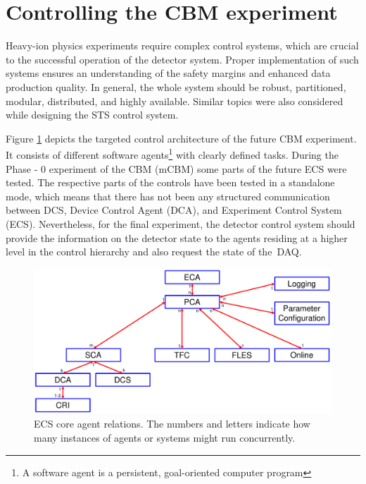 \section{Controlling the CBM experiment}

Heavy-ion physics experiments require complex control systems, which are crucial to the successful operation of the detector system. Proper implementation of such systems ensures an understanding of the safety margins and enhanced data production quality. In general, the whole system should be robust, partitioned, modular, distributed, and highly available. Similar topics were also considered while designing the \gls{STS} control system.

Figure \ref{fig_sim} depicts the targeted control architecture of the future \gls{CBM} experiment. It consists of different software agents\footnote{A software agent is a persistent, goal-oriented computer program} with clearly defined tasks. During the Phase - 0 experiment of the \gls{CBM} (\gls{mCBM}) some parts of the future \gls{ECS} were tested. The respective parts of the controls have been tested in a standalone mode, which means that there has not been any structured communication between \gls{DCS}, Device Control Agent (\gls{DCA}), and Experiment Control System (\gls{ECS}). Nevertheless, for the final experiment, the detector control system should provide the information on the detector state to the agents residing at a higher level in the control hierarchy and also request the state of the~\gls{DAQ}.

\begin{figure}[!h]
\centering
\includegraphics[width=0.8\columnwidth]{Chapter3/Controls/images/AgentsRelations_V2.pdf}
\caption{\gls{ECS} core agent relations. The numbers and letters indicate how many instances of agents or systems might run concurrently.}
\label{fig_sim}
\end{figure}

